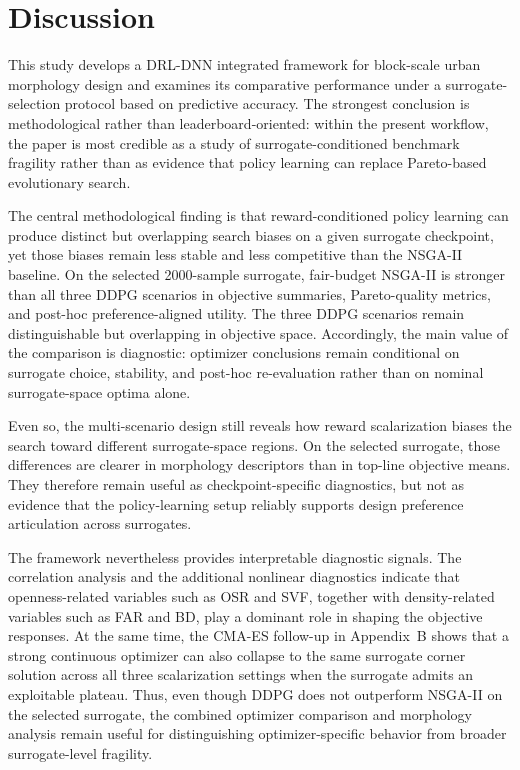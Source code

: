 \documentclass[final,3p,times]{elsarticle}
\begin{document}
\section{Discussion}

This study develops a DRL-DNN integrated framework for block-scale urban morphology design and examines its comparative performance under a surrogate-selection protocol based on predictive accuracy. The strongest conclusion is methodological rather than leaderboard-oriented: within the present workflow, the paper is most credible as a study of surrogate-conditioned benchmark fragility rather than as evidence that policy learning can replace Pareto-based evolutionary search.

The central methodological finding is that reward-conditioned policy learning can produce distinct but overlapping search biases on a given surrogate checkpoint, yet those biases remain less stable and less competitive than the NSGA-II baseline. On the selected 2000-sample surrogate, fair-budget NSGA-II is stronger than all three DDPG scenarios in objective summaries, Pareto-quality metrics, and post-hoc preference-aligned utility. The three DDPG scenarios remain distinguishable but overlapping in objective space. Accordingly, the main value of the comparison is diagnostic: optimizer conclusions remain conditional on surrogate choice, stability, and post-hoc re-evaluation rather than on nominal surrogate-space optima alone.

Even so, the multi-scenario design still reveals how reward scalarization biases the search toward different surrogate-space regions. On the selected surrogate, those differences are clearer in morphology descriptors than in top-line objective means. They therefore remain useful as checkpoint-specific diagnostics, but not as evidence that the policy-learning setup reliably supports design preference articulation across surrogates.

The framework nevertheless provides interpretable diagnostic signals. The correlation analysis and the additional nonlinear diagnostics indicate that openness-related variables such as OSR and SVF, together with density-related variables such as FAR and BD, play a dominant role in shaping the objective responses. At the same time, the CMA-ES follow-up in Appendix~B shows that a strong continuous optimizer can also collapse to the same surrogate corner solution across all three scalarization settings when the surrogate admits an exploitable plateau. Thus, even though DDPG does not outperform NSGA-II on the selected surrogate, the combined optimizer comparison and morphology analysis remain useful for distinguishing optimizer-specific behavior from broader surrogate-level fragility.
\end{document}
